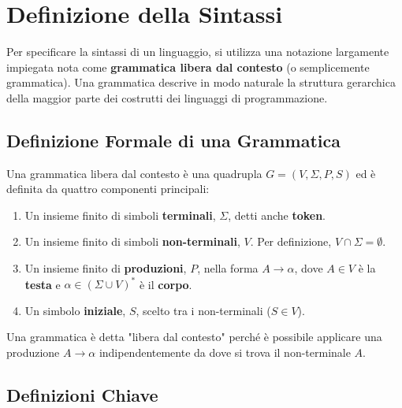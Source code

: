 \section{Definizione della Sintassi}

Per specificare la sintassi di un linguaggio, si utilizza una notazione largamente impiegata nota come \textbf{grammatica libera dal contesto} (o semplicemente grammatica). Una grammatica descrive in modo naturale la struttura gerarchica della maggior parte dei costrutti dei linguaggi di programmazione.

\subsection{Definizione Formale di una Grammatica}
Una grammatica libera dal contesto è una quadrupla $G = (V, \Sigma, P, S)$ ed è definita da quattro componenti principali:
\begin{enumerate}
    \item Un insieme finito di simboli \textbf{terminali}, $\Sigma$, detti anche \textbf{token}.
    \item Un insieme finito di simboli \textbf{non-terminali}, $V$. Per definizione, $V \cap \Sigma = \emptyset$.
    \item Un insieme finito di \textbf{produzioni}, $P$, nella forma $A \rightarrow \alpha$, dove $A \in V$ è la \textbf{testa} e $\alpha \in (\Sigma \cup V)^*$ è il \textbf{corpo}.
    \item Un simbolo \textbf{iniziale}, $S$, scelto tra i non-terminali ($S \in V$).
\end{enumerate}
Una grammatica è detta "libera dal contesto" perché è possibile applicare una produzione $A \rightarrow \alpha$ indipendentemente da dove si trova il non-terminale $A$.

\subsection{Definizioni Chiave}

